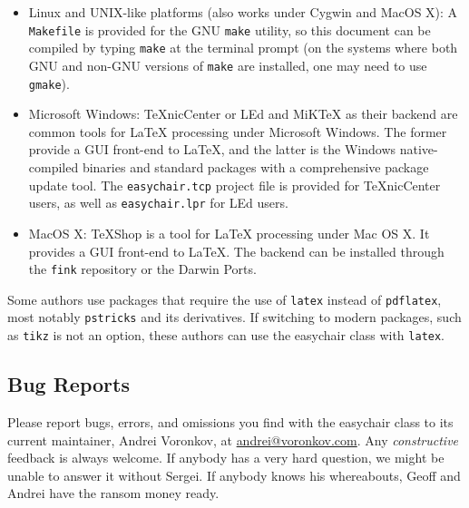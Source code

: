 \documentclass{imav2013}
\newcommand{\easychair}{\textsf{easychair}}
\newcommand{\miktex}{MiK{\TeX}}
\newcommand{\texniccenter}{{\TeX}nicCenter}
\newcommand{\makefile}{\texttt{Makefile}}
\newcommand{\latexeditor}{LEd}
\begin{document}
\begin{itemize}
\item
Linux and UNIX-like platforms (also works under Cygwin and MacOS X):
A {\makefile} is provided for the GNU \texttt{make} \cite{gmake} utility,
so this document can be compiled by typing \texttt{make} at the terminal 
prompt (on the systems where both GNU and non-GNU versions of \texttt{make} 
are installed, one may need to use \texttt{gmake}).

\item
Microsoft Windows:
{\texniccenter} \cite{texniccenter} or {\latexeditor} \cite{led} and
{\miktex} \cite{miktex} as their backend are common tools
for {\LaTeX} processing under Microsoft Windows. 
The former provide a GUI front-end to {\LaTeX}, and the latter is the 
Windows native-compiled binaries and standard packages with 
a comprehensive package update tool. 
The \texttt{easychair.tcp} project file is provided for {\texniccenter} users,
as well as \texttt{easychair.lpr} for {\latexeditor} users.

\item
MacOS X:
TeXShop \cite{texshop} is a tool for {\LaTeX} processing under Mac OS X.
It provides a GUI front-end to {\LaTeX}. The backend can be installed
through the \texttt{fink} \cite{fink} repository or the Darwin Ports.
\end{itemize}

Some authors use packages that require the use of \texttt{latex}
instead of \texttt{pdflatex}, most notably \texttt{pstricks} and its
derivatives. If switching to modern packages, such as
\texttt{tikz} is not an option, these authors can use the {\easychair}
class with \texttt{latex}. 

\subsection{Bug Reports}
\label{sec:bug-reports}

Please report bugs, errors, and omissions you find with the {\easychair} 
class to its current maintainer, Andrei Voronkov,
at \url{andrei@voronkov.com}. Any \emph{constructive} feedback is
always welcome. If anybody has a very hard question, we might be
unable to answer it without Sergei. If anybody knows his whereabouts,
Geoff and Andrei have the ransom money ready.

\end{document}
